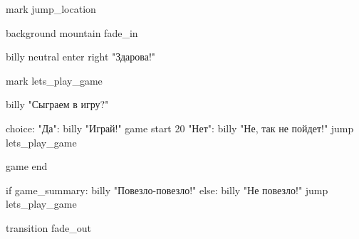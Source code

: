 mark jump_location

background mountain fade_in

billy neutral enter right "Здарова!"

mark lets_play_game

billy "Сыграем в игру?"

choice:
	"Да":
		billy "Играй!"
		game start 20
	"Нет":
		billy "Не, так не пойдет!"
		jump lets_play_game

game end

if game_summary:
	billy "Повезло-повезло!"
else:
	billy "Не повезло!"
	jump lets_play_game

transition fade_out